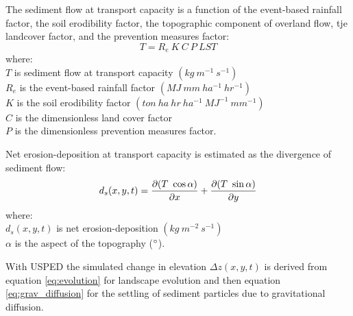 \documentclass[esurf, manuscript]{copernicus}
\begin{document}
The sediment flow at transport capacity is a function of 
the event-based rainfall factor, the soil erodibility factor, 
the topographic component of overland flow,
tje landcover factor, and the prevention measures factor:
%
\begin{equation}
\label{eq:usped}
{T = R_e ~ K ~ C ~ P ~ LST}
\end{equation}
{\small
\noindent
where: \\
\noindent
\hspace*{0.5em} $T$ is sediment flow at transport capacity $(kg ~ m^{-1} ~ s^{-1})$\\ 
\hspace*{0.5em} $R_e$ is the event-based rainfall factor $(MJ ~ mm ~ ha^{-1} ~ hr^{-1})$\\
\hspace*{0.5em} $K$ is the soil erodibility factor $(ton ~ ha ~ hr ~ ha^{-1} ~ MJ^{-1} ~ mm^{-1})$\\ %
\hspace*{0.5em} $C$ is the dimensionless land cover factor\\
\hspace*{0.5em} $P$ is the dimensionless prevention measures factor.\\
}

Net erosion-deposition at transport capacity is estimated as the divergence of sediment flow: 
\begin{equation}\label{eq:usped_erdep} 
d_s(x,y,t) = 
{\partial (T ~ \cos \alpha) \over \partial x} +
{\partial (T ~ \sin \alpha) \over \partial y}
\end{equation}
{\small
\noindent
where: \\
\hspace*{0.5em} $d_s(x,y,t)$ is net erosion-deposition $(kg ~ m^{-2} ~ s^{-1})$\\
\hspace*{0.5em} $\alpha$ is the aspect of the topography ($^{\circ}$).\\
}

With USPED the simulated change in elevation $\Delta z(x,y,t)$
is derived from equation \ref{eq:evolution} for landscape evolution
and then equation \ref{eq:grav_diffusion}
for the settling of sediment particles due to gravitational diffusion.

\end{document}
